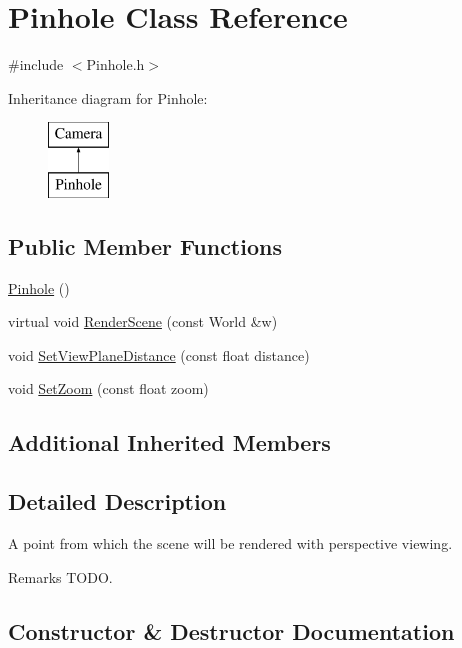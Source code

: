 \hypertarget{class_pinhole}{}\section{Pinhole Class Reference}
\label{class_pinhole}


{\ttfamily \#include $<$Pinhole.\+h$>$}

Inheritance diagram for Pinhole\+:\begin{figure}[H]
\begin{center}
\leavevmode
\includegraphics[height=2.000000cm]{class_pinhole}
\end{center}
\end{figure}
\subsection*{Public Member Functions}
\begin{DoxyCompactItemize}
\item 
\hyperlink{class_pinhole_aa106e56874db8211c2480096aff67051}{Pinhole} ()
\item 
virtual void \hyperlink{class_pinhole_a722af80f738cf4e8adba65926ffea9c9}{Render\+Scene} (const World \&w)
\item 
void \hyperlink{group___cameras_ga2757f00b8e8e778b6792b0c9e0e4052b}{Set\+View\+Plane\+Distance} (const float distance)
\item 
void \hyperlink{group___cameras_ga9baed583b61d1808867251fa33d4db56}{Set\+Zoom} (const float zoom)
\end{DoxyCompactItemize}
\subsection*{Additional Inherited Members}


\subsection{Detailed Description}
A point from which the scene will be rendered with perspective viewing. \begin{DoxyRemark}{Remarks}
T\+O\+DO. 
\end{DoxyRemark}


\subsection{Constructor \& Destructor Documentation}
\hypertarget{class_pinhole_aa106e56874db8211c2480096aff67051}{}\label{class_pinhole_aa106e56874db8211c2480096aff67051} 
